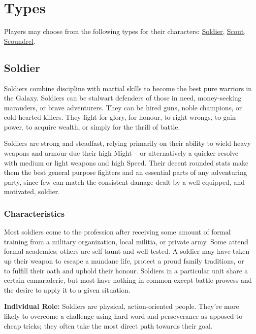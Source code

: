 \documentclass[a4paper,10pt,final,twocolumn,oneside]{book}
\newcommand{\itemLine}[2]{\textbf{#1:}{ #2}\par}
\begin{document}
\clearpage


\section{Types} %
\label{sec:types}

Players may choose from the following types for their characters: \hyperlink{sub:soldier}{Soldier}, \hyperlink{sub:scout}{Scout}, \hyperlink{sub:scoundrel}{Scoundrel}.

\subsection{Soldier} %
\label{sub:soldier}

Soldiers combine discipline with martial skills to become the best pure warriors in the Galaxy. Soldiers can be stalwart defenders of those in need, money-seeking marauders, or brave adventurers. They can be hired guns, noble champions, or cold-hearted killers. They fight for glory, for honour, to right wrongs, to gain power, to acquire wealth,  or simply for the thrill of battle.

Soldiers are strong and steadfast, relying primarily on their ability to wield heavy weapons and armour due their high Might -- or alternatively a quicker resolve with medium or light weapons and high Speed. Their decent rounded stats make them the best general purpose fighters and an essential parts of any adventuring party, since few can match the consistent damage dealt by a well equipped, and motivated, soldier.

\subsubsection*{Characteristics}
\label{subsub:soldierCharacteristics}

Most soldiers come to the profession after receiving some amount of formal training from a military organization, local militia, or private army. Some attend formal academies; others are self-taunt and well tested. A soldier may have taken up their weapon to escape a mundane life, protect a proud family traditions, or to fulfill their oath and uphold their honour. Soldiers in a particular unit share a certain camaraderie, but most have nothing in common except battle prowess and the desire to apply it to a given situation.

\itemLine{Individual Role}{Soldiers are physical, action-oriented people. They're more likely to overcome a challenge using hard word and perseverance as apposed to cheap tricks; they often take the most direct path towards their goal.}
\end{document}
